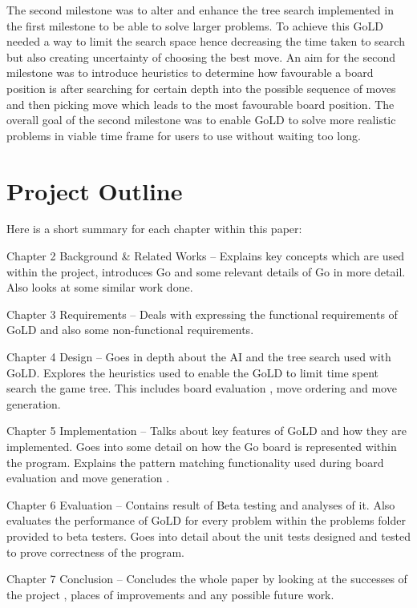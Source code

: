 \documentclass{l4proj}
\begin{document}
The second milestone was to alter and enhance the tree search implemented in the first milestone to be able to solve larger problems. To achieve this GoLD needed a way to limit the search space hence decreasing the time taken to search but also creating uncertainty of choosing the best move. An aim for the second milestone was to introduce heuristics to determine how favourable a board position is after searching for certain depth into the possible sequence of moves and then picking move which leads to the most favourable board position. The overall goal of the second milestone was to enable GoLD to solve more realistic problems in viable time frame for users to use without waiting too long.

\section{Project Outline}

Here is a short summary for each chapter within this paper:

Chapter 2 Background \& Related Works – Explains key concepts which are used within the project, introduces Go and some relevant details of Go in more detail. Also looks at some similar work done.

Chapter 3 Requirements – Deals with expressing the functional requirements of GoLD and also some non-functional requirements.


Chapter 4 Design – Goes in depth about the AI and the tree search used with GoLD.  Explores the heuristics used to enable the GoLD to limit time spent search the game tree. This includes board evaluation , move ordering and move generation.

Chapter 5 Implementation – Talks about key features of GoLD and how they are implemented. Goes into some detail on how the Go board is represented within the program. Explains the pattern matching functionality used during board evaluation and move generation .

Chapter 6 Evaluation – Contains result of Beta testing and analyses of it. Also evaluates the performance of GoLD for every problem within the problems folder provided to beta testers. Goes into detail about the unit tests designed and tested to prove correctness of the program.

Chapter 7 Conclusion – Concludes the whole paper by looking at the successes of the project , places of improvements and any possible future work.
\end{document}
